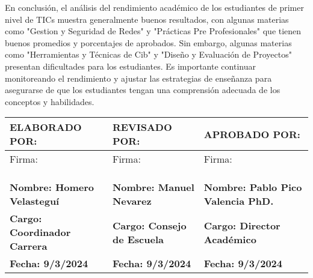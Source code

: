 En conclusión, el análisis del rendimiento académico de los estudiantes de primer nivel de TICs muestra generalmente buenos resultados, con algunas materias como "Gestion y Seguridad de Redes" y "Prácticas Pre Profesionales" que tienen buenos promedios y porcentajes de aprobados. Sin embargo, algunas materias como "Herramientas y Técnicas de Cib" y "Diseño y Evaluación de Proyectos" presentan dificultades para los estudiantes. Es importante continuar monitoreando el rendimiento y ajustar las estrategias de enseñanza para asegurarse de que los estudiantes tengan una comprensión adecuada de los conceptos y habilidades.\\
\vspace{1cm}\begin{tabularx}{\textwidth}{|X|X|X|}
\hline
\textbf{ELABORADO POR:} & \textbf{REVISADO POR:} & \textbf{APROBADO POR:} \\ \hline
Firma: & Firma: & Firma:\\
&&\\
&&\\
&&\\ \hline
\textbf{Nombre: Homero Velasteguí} & \textbf{Nombre: Manuel Nevarez} & \textbf{Nombre: Pablo Pico Valencia PhD.} \\ \hline
\textbf{Cargo: Coordinador Carrera} & \textbf{Cargo: Consejo de Escuela} & \textbf{Cargo: Director Académico} \\ \hline
\textbf{Fecha: 9/3/2024} & \textbf{Fecha: 9/3/2024} & \textbf{Fecha: 9/3/2024} \\ \hline
\end{tabularx}
